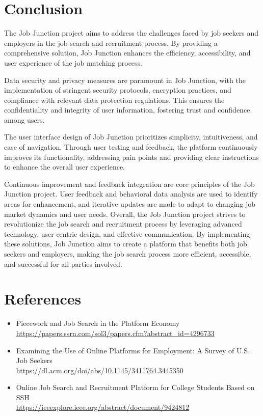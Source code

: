 \documentclass[a4paper,11pt]{report}
\begin{document}
\chapter{Conclusion}
The Job Junction project aims to address the challenges faced by job seekers and employers in the job
search and recruitment process. By providing a comprehensive solution, Job Junction enhances the
efficiency, accessibility, and user experience of the job matching process.

Data security and privacy measures are paramount in Job Junction, with the implementation of stringent
security protocols, encryption practices, and compliance with relevant data protection regulations. This
ensures the confidentiality and integrity of user information, fostering trust and confidence among
users.

The user interface design of Job Junction prioritizes simplicity, intuitiveness, and ease of navigation.
Through user testing and feedback, the platform continuously improves its functionality, addressing pain
points and providing clear instructions to enhance the overall user experience.

Continuous improvement and feedback integration are core principles of the Job Junction project. User
feedback and behavioral data analysis are used to identify areas for enhancement, and iterative updates
are made to adapt to changing job market dynamics and user needs.
Overall, the Job Junction project strives to revolutionize the job search and recruitment process by
leveraging advanced technology, user-centric design, and effective communication. By implementing
these solutions, Job Junction aims to create a platform that benefits both job seekers and employers,
making the job search process more efficient, accessible, and successful for all parties involved.

\chapter{References}

\begin{itemize}
\item Piecework and Job Search in the Platform Economy \\
  \url{https://papers.ssrn.com/sol3/papers.cfm?abstract_id=4296733}

  \item Examining the Use of Online Platforms for Employment: A Survey of U.S. Job Seekers \\
  \url{https://dl.acm.org/doi/abs/10.1145/3411764.3445350}

  \item Online Job Search and Recruitment Platform for College Students Based on SSH \\
  \url{https://ieeexplore.ieee.org/abstract/document/9424812}
  
\end{itemize}
\end{document}
